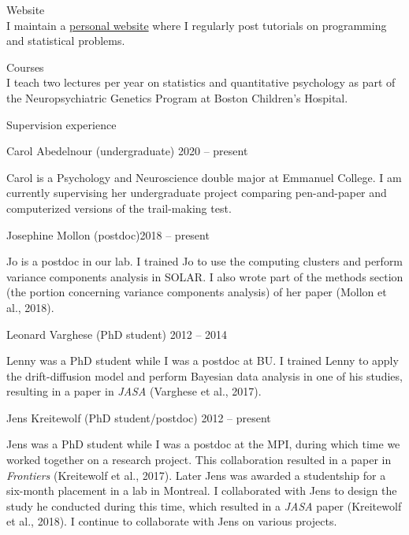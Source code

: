 \documentclass[10pt]{article}
\makeatletter
\newlength{\bibhang}
\newlength{\bibsep}
 {\@listi \global\bibsep\itemsep \global\advance\bibsep by\parsep}
\newenvironment{bibsection}%
        {\vspace{-\baselineskip}\begin{list}{}{%
       \setlength{\leftmargin}{\bibhang}%
       \setlength{\itemindent}{-\leftmargin}%
       \setlength{\itemsep}{\bibsep}%
       \setlength{\parsep}{\z@}%
        \setlength{\partopsep}{0pt}%
        \setlength{\topsep}{0pt}}}
        {\end{list}\vspace{-.6\baselineskip}}
\renewcommand{\section}[2]%
        {\pagebreak[2]\vspace{1.3\baselineskip}%
         \phantomsection\addcontentsline{toc}{section}{#1}%
         \hspace{0in}%
         \marginpar{
         \raggedright \scshape #1}#2}
\newenvironment{outerlist}[1][\enskip\textbullet]%
        {\begin{itemize}[#1]}{\end{itemize}%
         \vspace{-.6\baselineskip}}
\newenvironment{innerlist}[1][\enskip\textbullet]%
        {\begin{compactitem}[#1]}{\end{compactitem}}
\makeatother
\begin{document}
\section{Teaching}
\begin{bibsection}
\item Website\\
I maintain a \href{https://crackedbassoon.com}{personal website} where I regularly post tutorials on programming and statistical problems.
\item Courses\\
I teach two lectures per year on statistics and quantitative psychology as part of the Neuropsychiatric Genetics Program at Boston Children’s Hospital.
\item Supervision experience
\begin{outerlist}
\item[]Carol Abedelnour (undergraduate) \hfill{2020 -- present}
\begin{innerlist}\item Carol is a Psychology and Neuroscience double major at Emmanuel College. I am currently supervising her undergraduate project  comparing pen-and-paper and computerized versions of the trail-making test.\end{innerlist}
\item[]Josephine Mollon (postdoc)\hfill{2018 -- present}
\begin{innerlist}\item Jo is a postdoc in our lab. I trained Jo to use the computing clusters and perform variance components analysis in SOLAR. I also wrote part of the methods section (the portion concerning variance components analysis) of her paper (Mollon et al., 2018).\end{innerlist}
\item[]Leonard Varghese (PhD student) \hfill{2012 -- 2014}
\begin{innerlist}\item Lenny was a PhD student while I was a postdoc at BU. I trained Lenny to apply the drift-diffusion model and perform Bayesian data analysis in one of his studies, resulting in a paper in \emph{JASA} (Varghese et al., 2017).\end{innerlist}
\item[]Jens Kreitewolf (PhD student/postdoc) \hfill{2012 -- present}
\begin{innerlist}\item Jens was a PhD student while I was a postdoc at the MPI, during which time we worked together on a research project. This collaboration resulted in a paper in \emph{Frontiers} (Kreitewolf et al., 2017). Later Jens was awarded a studentship for a six-month placement in a lab in Montreal. I collaborated with Jens to design the study he conducted during this time, which resulted in a \emph{JASA} paper (Kreitewolf et al., 2018). I continue to collaborate with Jens on various projects.\end{innerlist}

\end{outerlist}
\end{bibsection}
\end{document}
